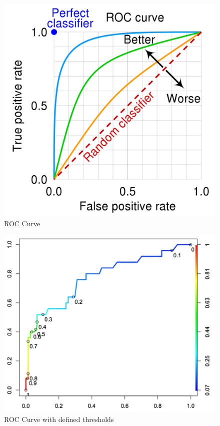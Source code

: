 \documentclass[
	number={3},
	title={Na\"iive Bayes Learning}
]{cs584notes}
\begin{document}
\begin{minipage}[m]{0.475\textwidth}
	\begin{figure}[H]
		\centering
		\includegraphics[width=\textwidth]{figures/3/roc_curve}
		\caption{ROC Curve}
		\label{fig:roc_curve}
	\end{figure}
\end{minipage}\hfill%
\begin{minipage}[m]{0.475\textwidth}
	\begin{figure}[H]
		\centering
		\includegraphics[width=\textwidth]{figures/3/rough_roc_curve}
		\caption{ROC Curve with defined thresholds}
		\label{fig:rough_roc_curve}
	\end{figure}
\end{minipage}
\end{document}
